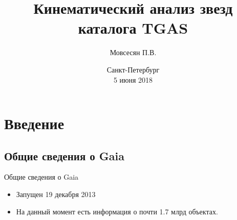 \documentclass{beamer}
\title{Кинематический анализ звезд каталога TGAS}
\author{Мовсесян П.В.}
\date{Санкт-Петербург \\ 
5 июня 2018}
\institute[СПбГУ]{Санкт-Петербургский Государственный Университет\\ 
\vspace{0.4cm} 
Научный руководитель: Цветков А.С. \\ 
Рецензент: Малкин З.М.\\ 
}
\begin{document}
\begin{frame}
  \titlepage
\end{frame}



\section{Введение}

\subsection{Общие сведения о Gaia}

\begin{frame}{Общие сведения о Gaia}
\begin{itemize}
\item Запущен 19 декабря 2013
\item На данный момент есть информация о почти 1.7 млрд объектах.
\end{itemize}
\end{frame}

\end{document}

